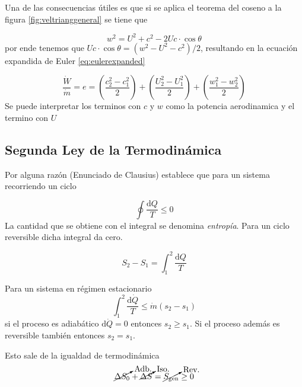 \documentclass{article}
\newcommand{\substy}[2]{\ensuremath{{#1_{\mathrm{#2}}}}}
\newcommand{\di}{\textrm{d}}
\newcommand{\Sgen}{\substy{S}{gen}}
\begin{document}
Una de las consecuencias útiles es que si se aplica el teorema del coseno a la figura \ref{fig:veltrianggeneral} se tiene que

\[
w^2 = U^2 +c^2 -2U c \cdot \cos \theta 
\]
por ende tenemos que $Uc\cdot \cos \theta = (w^2-U^2-c^2)/2$, resultando en la ecuación expandida de Euler \ref{eq:eulerexpanded}

\begin{equation} \label{eq:eulerexpanded}
    \frac{\dot{W}}{\dot{m}}=e= \left(\frac{c_2^2-c_1^2}{2}\right)+\left(\frac{U_2^2-U_1^2}{2}\right)+\left(\frac{w_1^2-w_2^2}{2}\right)
\end{equation}
Se puede interpretar los terminos con $c$ y $w$ como la potencia aerodinamica y el termino con $U$
\subsection{Segunda Ley de la Termodinámica}
Por alguna razón (Enunciado de Clausius) establece que para un sistema recorriendo un ciclo

\[
\oint \frac{\di Q}{T} \leq 0
\]
La cantidad que se obtiene con el integral se denomina \textit{entropía}. Para un ciclo reversible dicha integral da cero.

\[
S_2 - S_1 = \int^2_1 \frac{\di Q}{T}
\]

Para un sistema en régimen estacionario
\[
\int^2_1 \frac{\di\dot{Q}}{T} \leq \dot{m}(s_2 -s_1)
\]
si el proceso es adiabático $\di \dot{Q}=0$ entonces $s_2\geq s_1$.  Si el proceso además es reversible también entonces $s_2 =s_1$.

Esto sale de la igualdad de termodinámica
\[
\cancelto{\textrm{Adb.}}{\Delta S_0} + \cancelto{\textrm{Iso.}}{\Delta S} = \cancelto{\textrm{Rev.}}{\Sgen} \geq 0
\]
\end{document}
